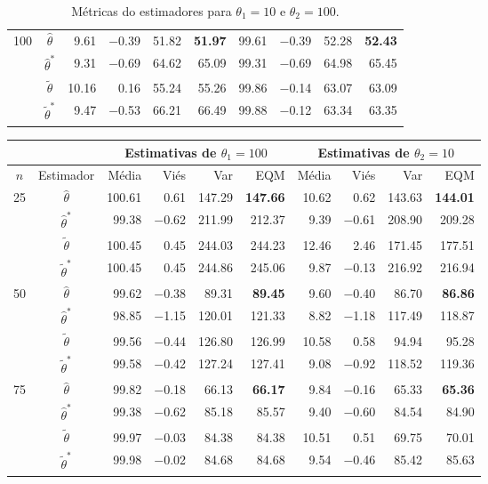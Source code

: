 \documentclass[12pt]{article}
\theoremstyle{definition}
\begin{document}
\begin{table}[htbp]
\begin{tabular}{c|c|rrrr|rrrr}
    \hline
    100 & $\hat{\theta}$ & 9.61 & $-$0.39 & 51.82 & \textbf{51.97} & 99.61 & $-$0.39 & 52.28 & \textbf{52.43} \\ 
        & $\hat{\theta}^*$ & 9.31 & $-$0.69 & 64.62 & 65.09 & 99.31 & $-$0.69 & 64.98 & 65.45 \\ 
        & $\tilde{\theta}$ & 10.16 & 0.16 & 55.24 & 55.26 & 99.86 & $-$0.14 & 63.07 & 63.09 \\ 
        & $\tilde{\theta}^*$ & 9.47 & $-$0.53 & 66.21 & 66.49 & 99.88 & $-$0.12 & 63.34 & 63.35 \\
    \hline
\end{tabular}
\caption{Métricas do estimadores para $\theta_1 = 10$ e $\theta_2 = 100$.}
\label{tab:10x100}
\end{table}


\begin{table}[htbp]
\centering
\begin{tabular}{c|c|rrrr|rrrr}
 \multicolumn{2}{c}{} & \multicolumn{4}{|c|}{Estimativas de $\theta_1=100$} &  \multicolumn{4}{c}{Estimativas de $\theta_2=10$} \\
  \hline
 $n$ & Estimador & Média & Viés & Var & EQM & Média & Viés & Var & EQM \\ 
  \hline
    25 & $\hat{\theta}$ & 100.61 & 0.61 & 147.29 & \textbf{147.66} & 10.62 & 0.62 & 143.63 & \textbf{144.01} \\ 
        & $\hat{\theta}^*$ & 99.38 & $-$0.62 & 211.99 & 212.37 & 9.39 & $-$0.61 & 208.90 & 209.28 \\ 
        & $\tilde{\theta}$ & 100.45 & 0.45 & 244.03 & 244.23 & 12.46 & 2.46 & 171.45 & 177.51 \\ 
        & $\tilde{\theta}^*$ & 100.45 & 0.45 & 244.86 & 245.06 & 9.87 & $-$0.13 & 216.92 & 216.94 \\ 
  
   \hline
    50 & $\hat{\theta}$ & 99.62 & $-$0.38 & 89.31 & \textbf{89.45} & 9.60 & $-$0.40 & 86.70 & \textbf{86.86} \\ 
        & $\hat{\theta}^*$ & 98.85 & $-$1.15 & 120.01 & 121.33 & 8.82 & $-$1.18 & 117.49 & 118.87 \\ 
        & $\tilde{\theta}$ & 99.56 & $-$0.44 & 126.80 & 126.99 & 10.58 & 0.58 & 94.94 & 95.28 \\ 
        & $\tilde{\theta}^*$ & 99.58 & $-$0.42 & 127.24 & 127.41 & 9.08 & $-$0.92 & 118.52 & 119.36 \\ 

    \hline
    75 & $\hat{\theta}$ & 99.82 & $-$0.18 & 66.13 & \textbf{66.17} & 9.84 & $-$0.16 & 65.33 & \textbf{65.36} \\ 
        & $\hat{\theta}^*$ & 99.38 & $-$0.62 & 85.18 & 85.57 & 9.40 & $-$0.60 & 84.54 & 84.90 \\ 
        & $\tilde{\theta}$ & 99.97 & $-$0.03 & 84.38 & 84.38 & 10.51 & 0.51 & 69.75 & 70.01 \\ 
        & $\tilde{\theta}^*$ & 99.98 & $-$0.02 & 84.68 & 84.68 & 9.54 & $-$0.46 & 85.42 & 85.63 \\ 


\end{tabular}
\end{table}
\end{document}
